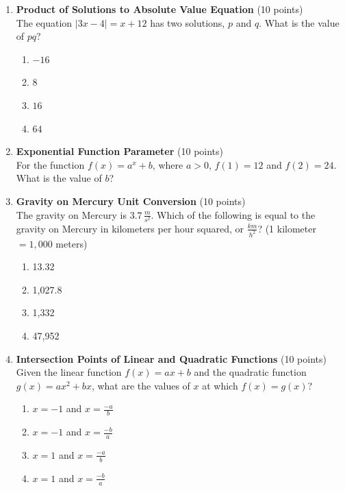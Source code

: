 \begin{enumerate}
  

  \item \textbf{Product of Solutions to Absolute Value Equation} (10 points)\\
  The equation $|3x-4| = x+12$ has two solutions, $p$ and $q$. What is the value of $pq$?
  \begin{enumerate}[label=(\Alph*)]
    \item $-16$
    \item $8$
    \item $16$
    \item $64$
  \end{enumerate}
  \begin{subanswer}
  \end{subanswer}


  

  \item \textbf{Exponential Function Parameter} (10 points)\\
  For the function $f(x) = a^x + b$, where $a > 0$, $f(1) = 12$ and $f(2) = 24$. What is the value of $b$?
  \begin{subanswer}
  \end{subanswer}


  

  \item \textbf{Gravity on Mercury Unit Conversion} (10 points)\\
  The gravity on Mercury is $3.7\,\frac{m}{s^2}$. Which of the following is equal to the gravity on Mercury in kilometers per hour squared, or $\frac{km}{h^2}$? (1 kilometer $= 1,000$ meters)
  \begin{enumerate}[label=(\Alph*)]
    \item 13.32
    \item 1,027.8
    \item 1,332
    \item 47,952
  \end{enumerate}
  \begin{subanswer}
  \end{subanswer}


  

  \item \textbf{Intersection Points of Linear and Quadratic Functions} (10 points)\\
  Given the linear function $f(x) = a x + b$ and the quadratic function $g(x) = a x^2 + b x$, what are the values of $x$ at which $f(x) = g(x)$?
  \begin{enumerate}[label=(\Alph*)]
    \item $x = -1$ and $x = \frac{-a}{b}$
    \item $x = -1$ and $x = \frac{-b}{a}$
    \item $x = 1$ and $x = \frac{-a}{b}$
    \item $x = 1$ and $x = \frac{-b}{a}$
  \end{enumerate}
  \begin{subanswer}
  \end{subanswer}


\end{enumerate}
